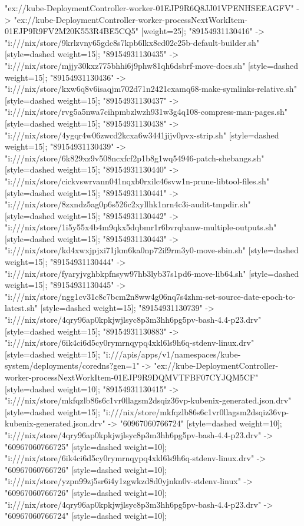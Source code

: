 {"ex://kube-DeploymentController-worker-01EJP9R6Q8JJ01VPENHSEEAGFV" -> "ex://kube-DeploymentController-worker-processNextWorkItem-01EJP9R9FV2M20K553R4BE5CQ5" [weight=25];
"89154931130416" -> "i:///nix/store/9krlzvny65gdc8s7kpb6lkx8cd02c25b-default-builder.sh" [style=dashed weight=15];
"89154931130435" -> "i:///nix/store/mjjy30kxz775bhhi6j9phw81qh6dsbrf-move-docs.sh" [style=dashed weight=15];
"89154931130436" -> "i:///nix/store/kxw6q8v6isaqjm702d71n2421cxamq68-make-symlinks-relative.sh" [style=dashed weight=15];
"89154931130437" -> "i:///nix/store/rvg5a5nwa7cihpmbzlwzh931w3g4q108-compress-man-pages.sh" [style=dashed weight=15];
"89154931130438" -> "i:///nix/store/4ygqr4w06zwcd2kcxa6w3441jijv0pvx-strip.sh" [style=dashed weight=15];
"89154931130439" -> "i:///nix/store/6k829xz9v508ncxfcf2p1b8g1wq54946-patch-shebangs.sh" [style=dashed weight=15];
"89154931130440" -> "i:///nix/store/cickvswrvann041nqxb0rxilc46svw1n-prune-libtool-files.sh" [style=dashed weight=15];
"89154931130441" -> "i:///nix/store/8zxndz5ag0p6s526c2xyllhk1nrn4c3i-audit-tmpdir.sh" [style=dashed weight=15];
"89154931130442" -> "i:///nix/store/1i5y55x4b4m9qkx5dqbmr1r6bvrqbanw-multiple-outputs.sh" [style=dashed weight=15];
"89154931130443" -> "i:///nix/store/kd4xwxjpjxi71jkm6ka0np72if9rm3y0-move-sbin.sh" [style=dashed weight=15];
"89154931130444" -> "i:///nix/store/fyaryjvghbkpfnsyw97hb3lyb37s1pd6-move-lib64.sh" [style=dashed weight=15];
"89154931130445" -> "i:///nix/store/ngg1cv31c8c7bcm2n8ww4g06nq7s4zhm-set-source-date-epoch-to-latest.sh" [style=dashed weight=15];
"89154931130739" -> "i:///nix/store/4qry96ap0kpkjwjlsyc8p3m3hh6pg5pv-bash-4.4-p23.drv" [style=dashed weight=15];
"89154931130883" -> "i:///nix/store/6ik4ci6d5cy0rymrnqypq4xkl6ls9h6q-stdenv-linux.drv" [style=dashed weight=15];
"i:///apis/apps/v1/namespaces/kube-system/deployments/coredns?gen=1" -> "ex://kube-DeploymentController-worker-processNextWorkItem-01EJP9R9DQMVTFBF07CYJQM5CF" [style=dashed weight=10];
"89154931130415" -> "i:///nix/store/mkfqzlb86s6c1vr0llagsm2dsqiz36vp-kubenix-generated.json.drv" [style=dashed weight=15];
"i:///nix/store/mkfqzlb86s6c1vr0llagsm2dsqiz36vp-kubenix-generated.json.drv" -> "60967060766724" [style=dashed weight=10];
"i:///nix/store/4qry96ap0kpkjwjlsyc8p3m3hh6pg5pv-bash-4.4-p23.drv" -> "60967060766725" [style=dashed weight=10];
"i:///nix/store/6ik4ci6d5cy0rymrnqypq4xkl6ls9h6q-stdenv-linux.drv" -> "60967060766726" [style=dashed weight=10];
"i:///nix/store/yzpn99zj5sr6i4y1zgwkzd8d0yjnkn0v-stdenv-linux" -> "60967060766726" [style=dashed weight=10];
"i:///nix/store/4qry96ap0kpkjwjlsyc8p3m3hh6pg5pv-bash-4.4-p23.drv" -> "60967060766724" [style=dashed weight=10];
}
